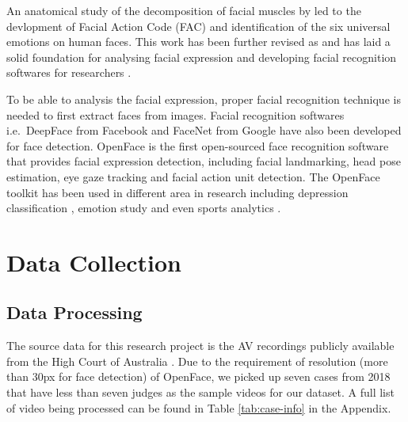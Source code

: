 \documentclass{monashthesis}
\begin{document}
An anatomical study of the decomposition of facial muscles by \autocite{ekman1976measuring} led to the devlopment of Facial Action Code (FAC) \autocite{ekman1978} and identification of the six universal emotions on human faces. This work has been further revised as \autocite{paulekmangroup} and has laid a solid foundation for analysing facial expression and developing facial recognition softwares for researchers \autocites{Kobayashi1992}{huang1997}{lien2000}{Kappoor2003}{Tong2007}{Cohn2009}{Lucey2010}.

To be able to analysis the facial expression, proper facial recognition technique is needed to first extract faces from images. Facial recognition softwares i.e.~DeepFace \autocite{taigman2014deepface} from Facebook and FaceNet \autocite{schroff2015facenet} from Google have also been developed for face detection. OpenFace \autocite{baltrusaitis2018openface} is the first open-sourced face recognition software that provides facial expression detection, including facial landmarking, head pose estimation, eye gaze tracking and facial action unit detection. The OpenFace toolkit has been used in different area in research including depression classification \autocites{yang2016decision}{nasir2016multimodal}, emotion study \autocites{Pan2018}{Nasir2016}{Huber2018} and even sports analytics \autocite{kovalchik2018going}.

\hypertarget{data-collection}{%
\chapter{Data Collection}\label{data-collection}}

\hypertarget{data-processing}{%
\section{Data Processing}\label{data-processing}}

The source data for this research project is the AV recordings publicly available from the High Court of Australia \autocite{highcourtau}. Due to the requirement of resolution (more than 30px for face detection) of OpenFace, we picked up seven cases from 2018 that have less than seven judges as the sample videos for our dataset. A full list of video being processed can be found in Table \ref{tab:case-info} in the Appendix.
\end{document}
